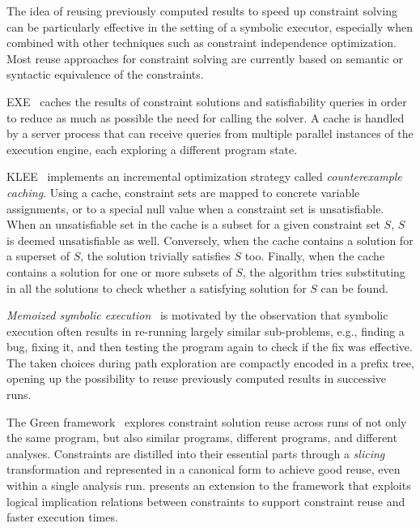 
The idea of reusing previously computed results to speed up constraint solving can be particularly effective in the setting of a symbolic executor, especially when combined with other techniques such as constraint independence optimization. Most reuse approaches for constraint solving are currently based on semantic or syntactic equivalence of the constraints.

{\sc EXE}~\cite{EXE-CCS06} caches the results of constraint solutions and satisfiability queries in order to reduce as much as possible the need for calling the solver. A cache is handled by a server process that can receive queries from multiple parallel instances of the execution engine, each exploring a different program state.

{\sc KLEE}~\cite{KLEE-OSDI08} implements an incremental optimization strategy called {\em counterexample caching}. Using a cache, constraint sets are mapped to concrete variable assignments, or to a special null value when a constraint set is unsatisfiable. When an unsatisfiable set in the cache is a subset for a given constraint set $S$, $S$ is deemed unsatisfiable as well. Conversely, when the cache contains a solution for a superset of $S$, the solution trivially satisfies $S$ too. Finally, when the cache contains a solution for one or more subsets of $S$, the algorithm tries substituting in all the solutions to check whether a satisfying solution for $S$ can be found.

{\em Memoized symbolic execution}~\cite{MEMO-ISSTA12} is motivated by the observation that symbolic execution often results in re-running largely similar sub-problems, e.g., finding a bug, fixing it, and then testing the program again to check if the fix was effective. The taken choices during path exploration are compactly encoded in a prefix tree, opening up the possibility to reuse previously computed results in successive runs.

The Green framework~\cite{GREEN-FSE12} explores constraint solution reuse across runs of not only the same program, but also similar programs, different programs, and different analyses. Constraints are distilled into their essential parts through a {\em slicing} transformation and represented in a canonical form to achieve good reuse, even within a single analysis run. \cite{JGY-ISSTA15} presents an extension to the framework that exploits logical implication relations between constraints to support constraint reuse and faster execution times.

